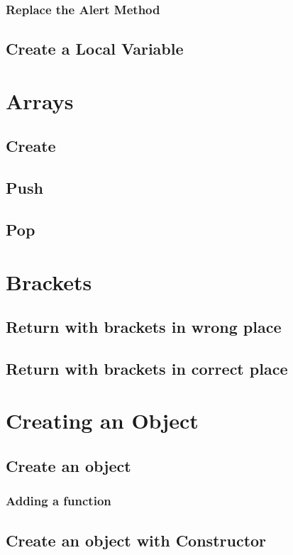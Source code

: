 \documentclass {amsart}
\begin{document}
			\subsubsection{Replace the Alert Method}
	\subsection{Create a Local Variable}


\section{Arrays}
	\subsection{Create}
	\subsection{Push}
	\subsection{Pop}

	
\section{Brackets}
	\subsection{Return with brackets in wrong place}
	\subsection{Return with brackets in correct place}

\section{Creating an Object}
	\subsection{Create an object}
		\subsubsection{Adding a function}
	\subsection{Create an object with Constructor}
\end{document}
